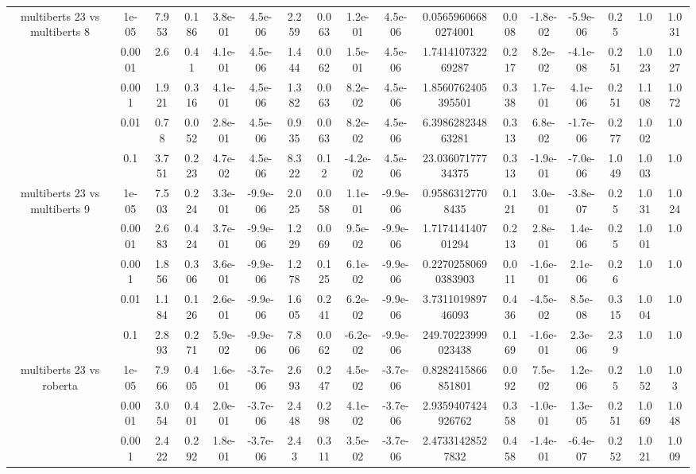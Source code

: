 \begin{tabular}{|c|c|c|c|c|c|c|c|c|c|c|c|c|c|c|c|c|}
\hline
\multirow{5}{*}{multiberts 23 vs multiberts 8} & 1e-05 & 7.953 & 0.186 & 3.8e-01 & 4.5e-06 & 2.259 & 0.063 & 1.2e-01 & 4.5e-06 & 0.05659606680274001 & 0.008 & -1.8e-02 & -5.9e-06 & 0.25 & 1.0 & 1.031 \\
 & 0.0001 & 2.6 & 0.41 & 4.1e-01 & 4.5e-06 & 1.444 & 0.062 & 1.5e-01 & 4.5e-06 & 1.741410732269287 & 0.217 & 8.2e-02 & -4.1e-08 & 0.251 & 1.023 & 1.027 \\
 & 0.001 & 1.921 & 0.316 & 4.1e-01 & 4.5e-06 & 1.382 & 0.063 & 8.2e-02 & 4.5e-06 & 1.8560762405395501 & 0.338 & 1.7e-01 & 4.1e-06 & 0.251 & 1.108 & 1.072 \\
 & 0.01 & 0.78 & 0.052 & 2.8e-01 & 4.5e-06 & 0.935 & 0.063 & 8.2e-02 & 4.5e-06 & 6.398628234863281 & 0.313 & 6.8e-02 & -1.7e-06 & 0.277 & 1.002 & 1.0 \\
 & 0.1 & 3.751 & 0.223 & 4.7e-02 & 4.5e-06 & 8.322 & 0.12 & -4.2e-02 & 4.5e-06 & 23.03607177734375 & 0.313 & -1.9e-01 & -7.0e-06 & 1.049 & 1.003 & 1.0 \\
\hline
\multirow{5}{*}{multiberts 23 vs multiberts 9} & 1e-05 & 7.503 & 0.224 & 3.3e-01 & -9.9e-06 & 2.025 & 0.058 & 1.1e-01 & -9.9e-06 & 0.95863127708435 & 0.121 & 3.0e-01 & -3.8e-07 & 0.25 & 1.031 & 1.024 \\
 & 0.0001 & 2.683 & 0.424 & 3.7e-01 & -9.9e-06 & 1.229 & 0.069 & 9.5e-02 & -9.9e-06 & 1.717414140701294 & 0.213 & 2.8e-01 & 1.4e-06 & 0.25 & 1.001 & 1.0 \\
 & 0.001 & 1.856 & 0.306 & 3.6e-01 & -9.9e-06 & 1.278 & 0.125 & 6.1e-02 & -9.9e-06 & 0.22702580690383903 & 0.011 & -1.6e-01 & 2.1e-06 & 0.26 & 1.0 & 1.0 \\
 & 0.01 & 1.184 & 0.126 & 2.6e-01 & -9.9e-06 & 1.605 & 0.241 & 6.2e-02 & -9.9e-06 & 3.731101989746093 & 0.436 & -4.5e-02 & 8.5e-08 & 0.315 & 1.004 & 1.0 \\
 & 0.1 & 2.893 & 0.271 & 5.9e-02 & -9.9e-06 & 7.806 & 0.062 & -6.2e-02 & -9.9e-06 & 249.70223999023438 & 0.169 & -1.6e-01 & 2.3e-06 & 2.39 & 1.0 & 1.0 \\
\hline
\multirow{5}{*}{multiberts 23 vs roberta } & 1e-05 & 7.966 & 0.405 & 1.6e-01 & -3.7e-06 & 2.693 & 0.247 & 4.5e-02 & -3.7e-06 & 0.8282415866851801 & 0.092 & 7.5e-02 & 1.2e-06 & 0.25 & 1.052 & 1.03 \\
 & 0.0001 & 3.054 & 0.401 & 2.0e-01 & -3.7e-06 & 2.448 & 0.298 & 4.1e-02 & -3.7e-06 & 2.9359407424926762 & 0.358 & -1.0e-01 & 1.3e-05 & 0.251 & 1.069 & 1.048 \\
 & 0.001 & 2.422 & 0.292 & 1.8e-01 & -3.7e-06 & 2.43 & 0.311 & 3.5e-02 & -3.7e-06 & 2.47331428527832 & 0.458 & -1.4e-01 & -6.4e-07 & 0.252 & 1.021 & 1.009 \\

\end{tabular}
